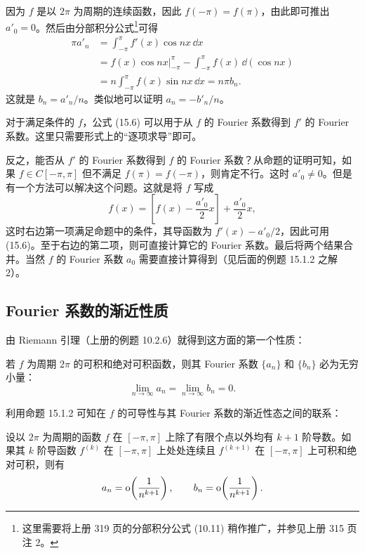 \begin{xproof}
因为 $f$ 是以 $2\pi$ 为周期的连续函数，因此 $f(-\pi)=f(\pi)$，由此即可推出 $a'_0=0$。然后由分部积分公式\footnote{这里需要将上册 319 页的分部积分公式 (10.11) 稍作推广，并参见上册 315 页注 2。}可得
\begin{align*}
  \pi a'_n
  &=\int_{-\pi}^{\pi}f'(x)\cos nx\,\dd x\\
  &=\left.f(x)\cos nx\right|_{-\pi}^{\pi}
    -\int_{-\pi}^{\pi}f(x)\,\dd(\cos nx)\\
  &=n\int_{-\pi}^{\pi}f(x)\sin nx\,\dd x
   =n\pi b_n.
\end{align*}
这就是 $b_n=a'_n/n$。类似地可以证明 $a_n=-b'_n/n$。
\end{xproof}

\begin{xremark}
对于满足条件的 $f$，公式 (15.6) 可以用于从 $f$ 的 Fourier 系数得到 $f'$ 的 Fourier 系数。这里只需要形式上的“逐项求导”即可。

反之，能否从 $f'$ 的 Fourier 系数得到 $f$ 的 Fourier 系数？从命题的证明可知，如果 $f\in C[-\pi,\pi]$ 但不满足 $f(\pi)=f(-\pi)$，则肯定不行。这时 $a'_0\ne0$。但是有一个方法可以解决这个问题。这就是将 $f$ 写成
\begin{equation}
  f(x)=\left[f(x)-\frac{a'_0}{2}x\right]+\frac{a'_0}{2}x,
  \tag{15.7}
  \label{eq:15.7}
\end{equation}
这时右边第一项满足命题中的条件，其导函数为 $f'(x)-a'_0/2$，因此可用 (15.6)。至于右边的第二项，则可直接计算它的 Fourier 系数。最后将两个结果合并。当然 $f$ 的 Fourier 系数 $a_0$ 需要直接计算得到（见后面的例题 15.1.2 之解 2）。
\end{xremark}

\subsection{Fourier 系数的渐近性质}

由 Riemann 引理（上册的例题 10.2.6）就得到这方面的第一个性质：

\begin{xproposition}[15.1.3]
若 $f$ 为周期 $2\pi$ 的可积和绝对可积函数，则其 Fourier 系数 $\{a_n\}$ 和 $\{b_n\}$ 必为无穷小量：
\[
  \lim_{n\to\infty}a_n=\lim_{n\to\infty}b_n=0.
\]
\end{xproposition}

利用命题 15.1.2 可知在 $f$ 的可导性与其 Fourier 系数的渐近性态之间的联系：

\begin{xproposition}[15.1.4]
设以 $2\pi$ 为周期的函数 $f$ 在 $[-\pi,\pi]$ 上除了有限个点以外均有 $k+1$ 阶导数。如果其 $k$ 阶导函数 $f^{(k)}$ 在 $[-\pi,\pi]$ 上处处连续且 $f^{(k+1)}$ 在 $[-\pi,\pi]$ 上可积和绝对可积，则有
\[
  a_n=\mathrm{o}\!\left(\frac1{n^{k+1}}\right),\qquad
  b_n=\mathrm{o}\!\left(\frac1{n^{k+1}}\right).
\]
\end{xproposition}

